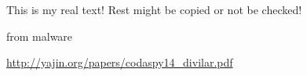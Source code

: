 This is my real text! Rest might be copied or not be checked!


from malware

\url{http://yajin.org/papers/codaspy14_divilar.pdf}
